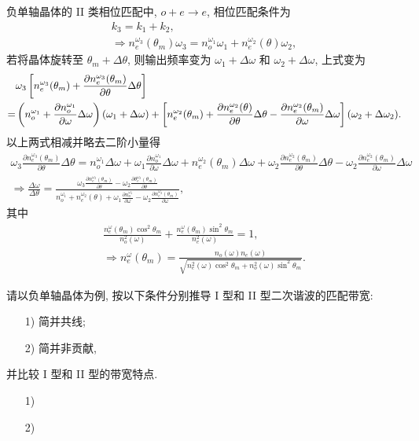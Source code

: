 \documentclass{assignment}
\begin{document}
\begin{sol}
    负单轴晶体的 II 类相位匹配中, $o+e\rightarrow e$, 相位匹配条件为
    \begin{gather}
        k_3=k_1+k_2,\\
        \Longrightarrow n_e^{\omega_3}(\theta_m)\omega_3=n_o^{\omega_1}\omega_1+n_e^{\omega_2}(\theta)\omega_2,
    \end{gather}
    若将晶体旋转至 $\theta_m+\Delta\theta$, 则输出频率变为 $\omega_1+\Delta\omega$ 和 $\omega_2+\Delta\omega$, 上式变为
    \begin{align}
        \notag&\omega_3\left[n_e^{\omega_3}(\theta_m)+\frac{\partial n_e^{\omega_3}(\theta_m)}{\partial\theta}\Delta\theta\right]\\
        =&\left(n_o^{\omega_1}+\frac{\partial n_o^{\omega_1}}{\partial\omega}\Delta\omega\right)(\omega_1+\Delta\omega)+\left[n_e^{\omega_2}(\theta_m)+\frac{\partial n_e^{\omega_2}(\theta)}{\partial\theta}\Delta\theta-\frac{\partial n_e^{\omega_2}(\theta_m)}{\partial\omega}\Delta\omega\right](\omega_2+\Delta\omega_2).
    \end{align}
    以上两式相减并略去二阶小量得
    \begin{gather}
        \omega_3\frac{\partial n_e^{\omega_3}(\theta_m)}{\partial\theta}\Delta\theta=n_o^{\omega_1}\Delta\omega+\omega_1\frac{\partial n_o^{\omega_1}}{\partial\omega}\Delta\omega+n_e^{\omega_2}(\theta_m)\Delta\omega+\omega_2\frac{\partial n_e^{\omega_2}(\theta_m)}{\partial\theta}\Delta\theta-\omega_2\frac{\partial n_e^{\omega_2}(\theta_m)}{\partial\omega}\Delta\omega\\
        \Longrightarrow\frac{\Delta\omega}{\Delta\theta}=\frac{\omega_3\frac{\partial n_e^{\omega_3}(\theta_m)}{\partial\theta}-\omega_2\frac{\partial\theta_e^{\omega_2}(\theta_m)}{\partial\theta}}{n_o^{\omega_1}+n_e^{\omega_2}(\theta)+\omega_1\frac{\partial n_o^{\omega_1}}{\partial\omega}-\omega_2\frac{\partial n_e^{\omega_2}(\theta_m)}{\partial\omega}},
    \end{gather}
    其中
    \begin{gather}
        \frac{n_e^{\omega}(\theta_m)\cos^2\theta_m}{n_o^2(\omega)}+\frac{n_e^{\omega}(\theta_m)\sin^2\theta_m}{n_e^2(\omega)}=1,\\
        \Longrightarrow n_e^{\omega}(\theta_m)=\frac{n_o(\omega)n_e(\omega)}{\sqrt{n_e^2(\omega)\cos^2\theta_m+n_o^2(\omega)\sin^2\theta_m}}.
    \end{gather}
\end{sol}

\begin{prob}
    请以负单轴晶体为例, 按以下条件分别推导 I 型和 II 型二次谐波的匹配带宽:
    \begin{itemize}
        \item[1)] 简并共线;
        \item[2)] 简并非贡献,
    \end{itemize}
    并比较 I 型和 II 型的带宽特点.
\end{prob}
\begin{pf}
    \begin{itemize}
        \item[1)] 
        \item[2)] 
    \end{itemize}
\end{pf}
\end{document}
